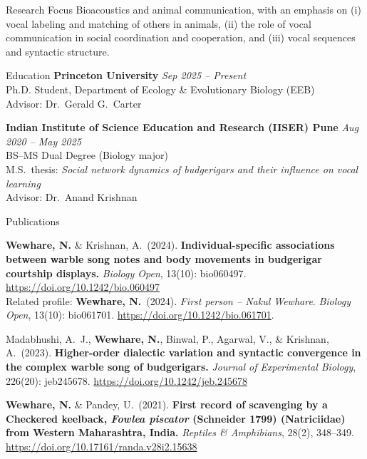\documentclass{resume}
\begin{document}
\begin{rSection}{Research Focus}
Bioacoustics and animal communication, with an emphasis on (i) vocal labeling and matching of others in animals, (ii) the role of vocal communication in social coordination and cooperation, and (iii) vocal sequences and syntactic structure.
\end{rSection}

\begin{rSection}{Education}
{\bf Princeton University} \hfill {\em Sep 2025 -- Present}\\
Ph.D. Student, Department of Ecology \& Evolutionary Biology (EEB)\\
Advisor: Dr.\ Gerald G.\ Carter

{\bf Indian Institute of Science Education and Research (IISER) Pune} \hfill {\em Aug 2020 -- May 2025}\\
BS--MS Dual Degree (Biology major) \hfill \\
M.S.\ thesis: \textit{Social network dynamics of budgerigars and their influence on vocal learning}\\
Advisor: Dr.\ Anand Krishnan
\end{rSection}

\begin{rSection}{Publications}
\item {\bf Wewhare, N.} \& Krishnan, A.\ (2024).
{\bf Individual-specific associations between warble song notes and body movements in budgerigar courtship displays.}
\textit{Biology Open}, 13(10): bio060497. \href{https://doi.org/10.1242/bio.060497}{https://doi.org/10.1242/bio.060497}\\
{\small Related profile: {\bf Wewhare, N.}\ (2024). \textit{First person -- Nakul Wewhare}.
\textit{Biology Open}, 13(10): bio061701. \href{https://doi.org/10.1242/bio.061701}{https://doi.org/10.1242/bio.061701}.}

\item Madabhushi, A.\ J., {\bf Wewhare, N.}, Binwal, P., Agarwal, V., \& Krishnan, A.\ (2023).
{\bf Higher-order dialectic variation and syntactic convergence in the complex warble song of budgerigars.}
\textit{Journal of Experimental Biology}, 226(20): jeb245678. \href{https://doi.org/10.1242/jeb.245678}{https://doi.org/10.1242/jeb.245678}

\item {\bf Wewhare, N.} \& Pandey, U.\ (2021).
{\bf First record of scavenging by a Checkered keelback, \textit{Fowlea piscator} (Schneider 1799) (Natriciidae) from Western Maharashtra, India.}
\textit{Reptiles \& Amphibians}, 28(2), 348--349. \href{https://doi.org/10.17161/randa.v28i2.15638}{https://doi.org/10.17161/randa.v28i2.15638}
\end{rSection}
\end{document}
